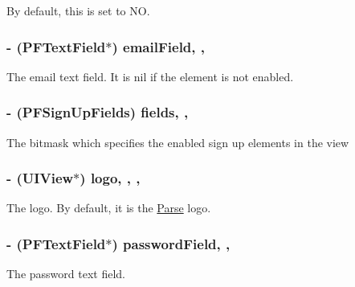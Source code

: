 By default, this is set to {\ttfamily N\+O}. \hypertarget{interface_p_f_sign_up_view_a4f01a403ba349386d546669a320b81fb}{}
\subsubsection[{email\+Field}]{\setlength{\rightskip}{0pt plus 5cm}-\/ ({\bf P\+F\+Text\+Field}$\ast$) email\+Field\hspace{0.3cm}{\ttfamily [read]}, {\ttfamily [nonatomic]}, {\ttfamily [strong]}}\label{interface_p_f_sign_up_view_a4f01a403ba349386d546669a320b81fb}
The email text field. It is {\ttfamily nil} if the element is not enabled. \hypertarget{interface_p_f_sign_up_view_a63e26333d686db43da83c0213c3e5229}{}
\subsubsection[{fields}]{\setlength{\rightskip}{0pt plus 5cm}-\/ (P\+F\+Sign\+Up\+Fields) fields\hspace{0.3cm}{\ttfamily [read]}, {\ttfamily [nonatomic]}, {\ttfamily [assign]}}\label{interface_p_f_sign_up_view_a63e26333d686db43da83c0213c3e5229}
The bitmask which specifies the enabled sign up elements in the view \hypertarget{interface_p_f_sign_up_view_ad3eb048df63f20896124028eb911016a}{}
\subsubsection[{logo}]{\setlength{\rightskip}{0pt plus 5cm}-\/ (U\+I\+View$\ast$) logo\hspace{0.3cm}{\ttfamily [read]}, {\ttfamily [write]}, {\ttfamily [nonatomic]}, {\ttfamily [strong]}}\label{interface_p_f_sign_up_view_ad3eb048df63f20896124028eb911016a}
The logo. By default, it is the \hyperlink{interface_parse}{Parse} logo. \hypertarget{interface_p_f_sign_up_view_a626e890c1c1039321b71dc774fc080bc}{}
\subsubsection[{password\+Field}]{\setlength{\rightskip}{0pt plus 5cm}-\/ ({\bf P\+F\+Text\+Field}$\ast$) password\+Field\hspace{0.3cm}{\ttfamily [read]}, {\ttfamily [nonatomic]}, {\ttfamily [strong]}}\label{interface_p_f_sign_up_view_a626e890c1c1039321b71dc774fc080bc}
The password text field. \hypertarget{interface_p_f_sign_up_view_a48e4f5a10409de79d5a3e3bc18de0213}{}
